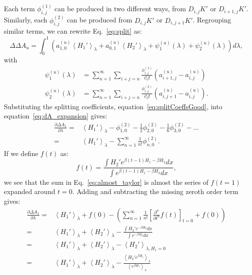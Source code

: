\documentclass{article}
\begin{document}
Each term $\phi_{i,j}^{(1)}$ can be produced in two different ways, from $D_{i,j}K'$ or $D_{i+1,j}K'$. Similarly, each $\phi_{i,j}^{(2)}$ can be produced from $D_{i,j}K'$ or $D_{i,j+1}K'$. Regrouping similar terms, we can rewrite Eq.~\ref{eq:split} as: 
\begin{equation}
\Delta\Delta {A_u}=
	\int_0^1 \left(
        a_{1,0}^{(u)}\left\langle H_1' \right\rangle_{\lambda} +
        a_{0,1}^{(u)}\left\langle H_2' \right\rangle_{\lambda} +
        \psi_1^{(u)}(\lambda) +
        \psi_2^{(u)}(\lambda)
    \right) d\lambda,
\label{eq:dA_expansion}
\end{equation}
with
\begin{align}
\psi_1^{(u)}(\lambda) &=
	\sum_{n=1}^{\infty}
    \sum_{i+j=n}
        \frac{\phi_{i,j}^{(1)}}{i!j!}
        \left(
            {a_{i+1,j}^{(u)}} -
            {a_{i,j}^{(u)}}
        \right) \label{eq:psi1}\\
\psi_2^{(u)}(\lambda) &=
	\sum_{n=1}^{\infty}
    \sum_{i+j=n}
        \frac{\phi_{i,j}^{(2)}}{i!j!}
        \left(
            a_{i,j+1}^{(u)} -
            a_{i,j}^{(u)}
      	\right)\label{eq:psi2}.
\end{align}
Substituting the splitting coefficients, equation~\ref{eq:splitCoeffsGood}, into equation~\ref{eq:dA_expansion} gives:
\begin{align}
\frac{\partial \Delta A_1}{\partial\lambda} =& 
	\left\langle
		 H_1'
	\right\rangle_\lambda -
	\phi_{1,0}^{(2)} -
	\frac{1}{2} \phi_{2,0}^{(2)} -
	\frac{1}{6} \phi_{3,0}^{(2)} - \ldots \nonumber\\
	=&
	\left\langle
		H_1'
	\right\rangle_\lambda -
	\sum_{n=1}^{\infty} \frac{1}{n!} \phi_{n,0}^{(2)}.
\label{eq:almost_taylor}
\end{align}
If we define $f(t)$ as:
\begin{equation}
f(t) = \frac
	{\int H_2' e^{\beta(t-1) H_1 - \beta H_2} dx}
	{\int e^{\beta(t-1) H_1 - \beta H_2} dx},
\end{equation}
we see that the sum in Eq.~\ref{eq:almost_taylor} is almost the series of $f(t=1)$ expanded around $t=0$. Adding and subtracting the missing zeroth order term gives:
\begin{align}
\frac{\partial \Delta A_1}{\partial \lambda} =&
	\left\langle
		H_1'
	\right\rangle_\lambda +
	f(0) -
	\left(
		\sum_{n=1}^{\infty} \frac{1}{n!}
		\left[ \frac{\partial^n}{\partial t^n} f(t) \right]_{t=0}
		+ f(0)
	\right)\nonumber\\
=&
	\left\langle
		H_1'
	\right\rangle_\lambda +
	\left\langle
		H_2'
	\right\rangle_\lambda -
	\frac
		{\int H_2' e^{-\beta H_2} dx}
		{\int e^{-\beta H_2} dx} \nonumber \\
=&
	\left\langle
		H_1'
	\right\rangle_\lambda +
	\left\langle
		H_2'
	\right\rangle_\lambda -
	\left\langle
		H_2'
	\right\rangle_{\lambda, H_1=0} \nonumber \\
=&
	\left\langle
		H_1'
	\right\rangle_\lambda +
	\left\langle
		H_2'
	\right\rangle_\lambda -
	\frac
		{\left\langle H_2' e^{\beta H_1} \right\rangle_\lambda}
		{\left\langle e^{\beta H_1} \right\rangle_\lambda}
	\label{eq:same_ensemble}
\end{align}
\end{document}
